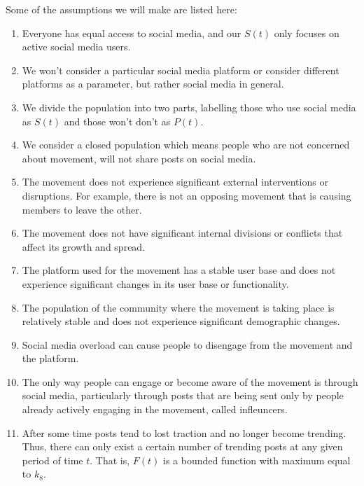\documentclass{article}
\begin{document}
    Some of the assumptions we will make are listed here:
    \begin{enumerate}
    \item  Everyone has equal access to social media, and our $S(t)$ only focuses on active social media users.
    
    \item We won't consider a particular social media platform or consider different platforms as a parameter, but rather social media in general. 
    
    \item We divide the population into two parts, labelling those who use social media as $S(t)$ and those won't don't as $P(t)$. 
    
    \item We consider a closed population which means people who are not concerned about movement, will not share posts on social media. 
    
    \item The movement does not experience significant external interventions or disruptions. For example, there is not an opposing movement that is causing members to leave the other. 
    
    \item The movement does not have significant internal divisions or conflicts that affect its growth and spread.
    
    \item The platform used for the movement has a stable user base and does not experience significant changes in its user base or functionality.

    \item The population of the community where the movement is taking place is relatively stable and does not experience significant demographic changes.

    \item Social media overload can cause people to disengage from the movement and the platform.
    
    \item  The only way people can engage or become aware of the movement is through social media, particularly through posts that are being sent only by people already actively engaging in the movement, called infleuncers. 
    
    \item  After some time posts tend to lost traction and no longer become trending. Thus, there can only exist a certain number of trending posts at any given period of time $t$. That is, $F(t)$ is a bounded function with maximum equal to $k_8$. 


\end{enumerate}
\end{document}
